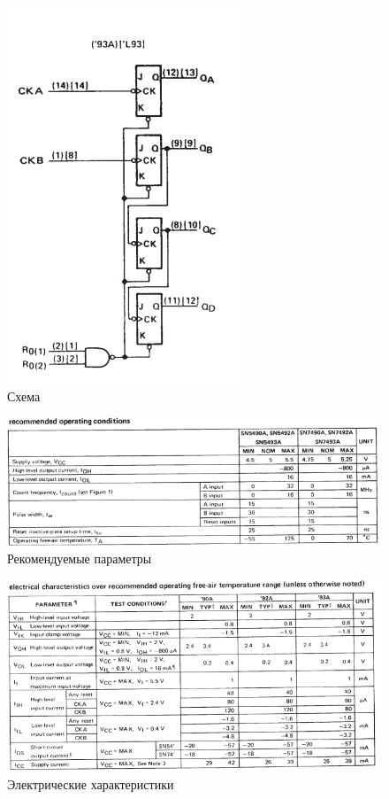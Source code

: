 \begin{figure}[H]
	\centering
	\includegraphics[width=0.55\linewidth]{imgs/12/12_sh}
	\caption{Схема}
	\label{fig:12_sh}
\end{figure}

\begin{figure}[H]
	\centering
	\includegraphics[width=0.95\linewidth]{imgs/12/12_rec}
	\caption{Рекомендуемые параметры}
	\label{fig:12_rec}
\end{figure}

\begin{figure}[H]
	\centering
	\includegraphics[width=0.95\linewidth]{imgs/12/12_ch}
	\caption{Электрические характеристики}
	\label{fig:12_ch}
\end{figure}

